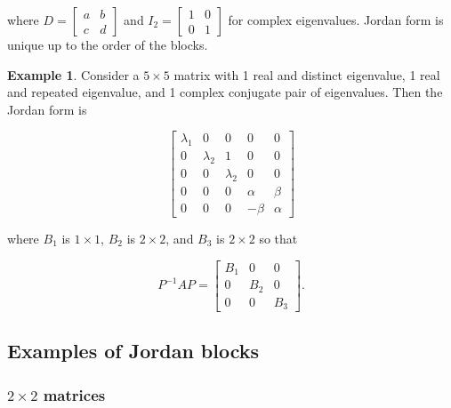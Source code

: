 \documentclass[12pt]{article}
\theoremstyle{definition}
\newtheorem*{example}{Example}
\begin{document}
where $D = \begin{bmatrix} a & b \\ c & d \end{bmatrix}$ and $I_2 = \begin{bmatrix} 1 & 0 \\ 0 & 1 \end{bmatrix}$ for complex
eigenvalues. Jordan form is unique up to the order of the blocks. 


\begin{example}
Consider a $5 \times 5$ matrix with 1 real and distinct eigenvalue, 1 real and repeated eigenvalue, and 1 complex conjugate
pair of eigenvalues. Then the Jordan form is

\[
\left[
\begin{array}{c|cc|cc}
\lambda_1 &     0      & 0         & 0      & 0 \\ \hline
0         & \lambda_2  & 1         & 0      & 0 \\
0         & 0          & \lambda_2 & 0      & 0 \\ \hline
0         & 0          & 0         & \alpha & \beta \\
0         & 0          & 0         & -\beta & \alpha
\end{array}
\right]
\]

where $B_1$ is $1 \times 1$, $B_2$ is $2 \times 2$, and $B_3$ is $2 \times 2$ so that

\begin{equation*}
P^{-1}AP =
\begin{bmatrix}
B_1 & 0 & 0 \\
0 & B_2 & 0 \\
0 & 0 & B_3
\end{bmatrix}
.
\end{equation*}
\end{example}

\subsection{Examples of Jordan blocks}

\subsubsection{$2 \times 2$ matrices}
\end{document}
